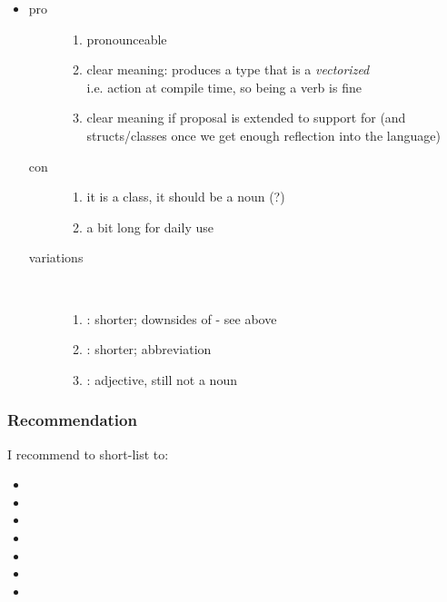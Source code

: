 \begin{itemize}
  \item {}
    \begin{description}
      \item[pro]
        \begin{enumerate}
          \item pronounceable
          \item clear meaning: produces a type that is a \emph{vectorized} \\
            i.e. action at compile time, so being a verb is fine
          \item clear meaning if proposal is extended to support  for  (and structs/classes once we get enough reflection into the language)
        \end{enumerate}
      \item[con]
        \begin{enumerate}
          \item it is a class, it should be a noun (?)
          \item a bit long for daily use
        \end{enumerate}
      \item[variations]\ 
        \begin{enumerate}
          \item {}: shorter; downsides of  - see above
          \item \code{vectize<T>}: shorter; abbreviation
          \item {}: adjective, still not a noun
        \end{enumerate}
    \end{description}
\end{itemize}

\subsubsection{Recommendation}
I recommend to short-list to:
\begin{itemize}
  \item {}
  \item {}
  \item {}
  \item {}
  \item {}
  \item {}
  \item {}
\end{itemize}

